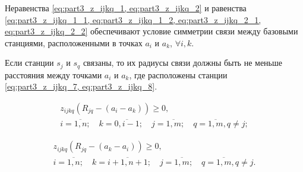 





Неравенства \cref{eq:part3_z_ijkq_1, eq:part3_z_ijkq_2} и равенства \cref{eq:part3_z_ijkq_1_1, eq:part3_z_ijkq_1_2, eq:part3_z_ijkq_2_1, eq:part3_z_ijkq_2_2} обеспечивают условие симметрии связи между базовыми станциями, расположенными в точках $ a_i $ и $ a_k $, $\forall i, k $. 


Если станции $ s_j $ и $ s_q $ связаны, то их радиусы связи должны быть не меньше расстояния между точками $ a_i $ и $ a_k $, где расположены станции \cref{eq:part3_z_ijkq_7, eq:part3_z_ijkq_8}.

\begin{equation}
    \begin{gathered}
  \label{eq:part3_z_ijkq_7}
  z_{ijkq}(R_{jq}-(a_i-a_k ))\geq 0, \\i= \overline{1,n}; \quad k=\overline{0,i-1}; \quad j=\overline{1,m}; \quad q= \overline{1,m}, q \neq j; 
    \end{gathered}
\end{equation}

\begin{equation}
    \begin{gathered}
  \label{eq:part3_z_ijkq_8}
  z_{ijkq} (R_{jq}-(a_k-a_i )) \geq 0,  \\ i= \overline{1,n}; \quad k=\overline{i+1,n+1};  \quad j=\overline{1,m}; \quad q= \overline{1,m}, q \neq j.
    \end{gathered}
\end{equation}

